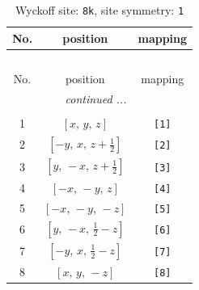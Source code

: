 \documentclass[fleqn,8pt]{jsarticle}
\begin{document}
\renewcommand{\arraystretch}{1.2}
\begin{longtable}{ccc}
\caption{Wyckoff site: {\tt 8k}, site symmetry: {\tt 1}}
 \\
 \hline \hline
No. & position & mapping \\ \hline \endfirsthead

\multicolumn{2}{l}{\tablename\ \thetable{}} \\
 \hline \hline
No. & position & mapping \\ \hline \endhead

 \hline \hline
\multicolumn{2}{r}{\footnotesize\it continued ...} \\ \endfoot

 \hline \hline
\multicolumn{2}{r}{} \\ \endlastfoot

1 & $\left[ x,\, y,\, z \right]$ & {\tt [1]} \\ \hline
2 & $\left[ - y,\, x,\, z + \frac{1}{2} \right]$ & {\tt [2]} \\ \hline
3 & $\left[ y,\, - x,\, z + \frac{1}{2} \right]$ & {\tt [3]} \\ \hline
4 & $\left[ - x,\, - y,\, z \right]$ & {\tt [4]} \\ \hline
5 & $\left[ - x,\, - y,\, - z \right]$ & {\tt [5]} \\ \hline
6 & $\left[ y,\, - x,\, \frac{1}{2} - z \right]$ & {\tt [6]} \\ \hline
7 & $\left[ - y,\, x,\, \frac{1}{2} - z \right]$ & {\tt [7]} \\ \hline
8 & $\left[ x,\, y,\, - z \right]$ & {\tt [8]} \\
\end{longtable}
\end{document}
